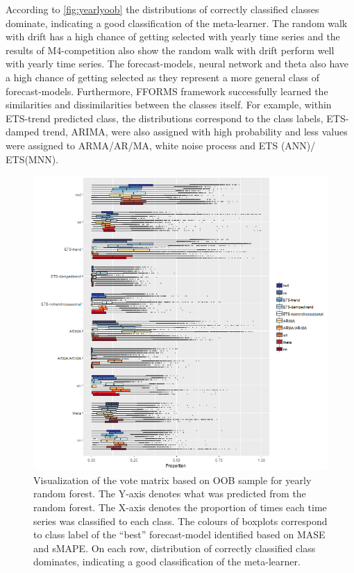 \documentclass[11pt,a4paper,]{article}
\begin{document}
According to \autoref{fig:yearlyoob} the distributions of correctly
classified classes dominate, indicating a good classification of the
meta-learner. The random walk with drift has a high chance of getting
selected with yearly time series and the results of M4-competition also
show the random walk with drift perform well with yearly time series.
The forecast-models, neural network and theta also have a high chance of
getting selected as they represent a more general class of
forecast-models. Furthermore, FFORMS framework successfully learned the
similarities and dissimilarities between the classes itself. For
example, within ETS-trend predicted class, the distributions correspond
to the class labels, ETS-damped trend, ARIMA, were also assigned with
high probability and less values were assigned to ARMA/AR/MA, white
noise process and ETS (ANN)/ ETS(MNN).

\begin{figure}
\centering
\includegraphics{figures/yearlyoob-1.png}
\caption{\label{fig:yearlyoob}Visualization of the vote matrix based on OOB
sample for yearly random forest. The Y-axis denotes what was predicted
from the random forest. The X-axis denotes the proportion of times each
time series was classified to each class. The colours of boxplots
correspond to class label of the ``best'' forecast-model identified
based on MASE and sMAPE. On each row, distribution of correctly
classified class dominates, indicating a good classification of the
meta-learner.}
\end{figure}
\end{document}
